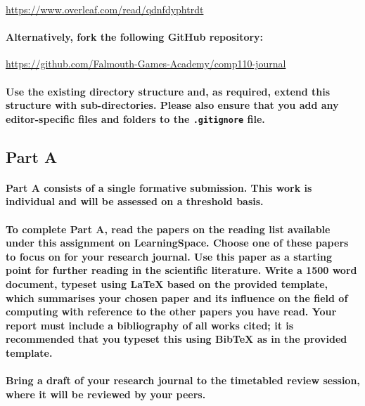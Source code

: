\documentclass{../../fal_assignment}
\begin{document}
\url{https://www.overleaf.com/read/qdnfdyphtrdt}

\paragraph{Alternatively, fork the following GitHub repository:}

\url{https://github.com/Falmouth-Games-Academy/comp110-journal}

\paragraph{Use the existing directory structure and, as required, extend this structure with sub-directories.
Please also ensure that you add any editor-specific files and folders to the \texttt{.gitignore} file.}

\subsection*{Part A}

\paragraph{Part A consists of a \textbf{single formative submission}. This work is \textbf{individual} and will be assessed on a \textbf{threshold} basis.}

\paragraph{
To complete Part A, read the papers on the reading list available under this assignment on LearningSpace.
Choose \textbf{one} of these papers to focus on for your research journal.
Use this paper as a starting point for further reading in the scientific literature.
Write a 1500 word document, typeset using LaTeX based on the provided template,
which summarises your chosen paper and its influence on the field of computing
with reference to the other papers you have read.
Your report must include a bibliography of all works cited;
it is recommended that you typeset this using BibTeX as in the provided template.
}

\paragraph{
Bring a draft of your research journal to the timetabled review session,
where it will be reviewed by your peers.
}
\end{document}
